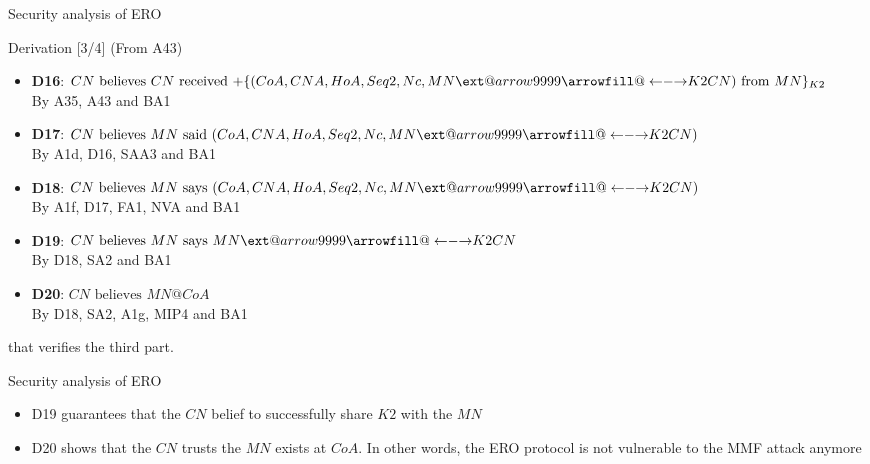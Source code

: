 \documentclass[10pt]{beamer}
\makeatletter
\newcommand\xleftrightarrow[2][]{%
  \ext@arrow 9999{\longleftrightarrowfill@}{#1}{#2}}
\newcommand\longleftrightarrowfill@{%
  \arrowfill@\leftarrow\relbar\rightarrow}
\newcommand{\xtext}[1]{\text{ #1 }}
\makeatother
\begin{document}
\begin{frame}{Security analysis of ERO}
	\begin{block}{Derivation [3/4]}
		(From A43)
		\begin{itemize}
			\item \textbf{D16}: {\small $CN \xtext{believes} CN \xtext{received} {+}\{(CoA, CNA, HoA, Seq2, Nc, MN \xleftrightarrow{K2}CN) \xtext{from} MN\}_{K2}$ \\ \hspace{1.7cm} By A35, A43 and BA1}
			\item \textbf{D17}: {\small $CN \xtext{believes} MN \xtext{said} (CoA, CNA, HoA, Seq2, Nc, MN \xleftrightarrow{K2} CN)$ \\ \hspace{1.7cm} By A1d, D16, SAA3 and BA1}
			\item \textbf{D18}: {\small $CN \xtext{believes} MN \xtext{says} (CoA, CNA, HoA, Seq2, Nc, MN \xleftrightarrow{K2} CN)$ \\ \hspace{1.7cm} By A1f, D17, FA1, NVA and BA1}
			\item \textbf{D19}: {\small $CN \xtext{believes} MN \xtext{says} MN \xleftrightarrow{K2} CN$ \\ \hspace{1.7cm} By D18, SA2 and BA1}
			\item \textbf{D20}: {\small $CN \xtext{believes} MN@CoA$ \\ \hspace{1.7cm} By D18, SA2, A1g, MIP4 and BA1}
		\end{itemize}
		\par that verifies the third part.
	\end{block}
\end{frame}
\begin{frame}{Security analysis of ERO}
	\begin{itemize}
		\item D19 guarantees that the $CN$ belief to successfully share $K2$ with the $MN$
		\item D20 shows that the $CN$ trusts the $MN$ exists at $CoA$. In other words, \alert{the ERO protocol is not vulnerable to the MMF attack anymore}
	\end{itemize}
\end{frame}
\end{document}
